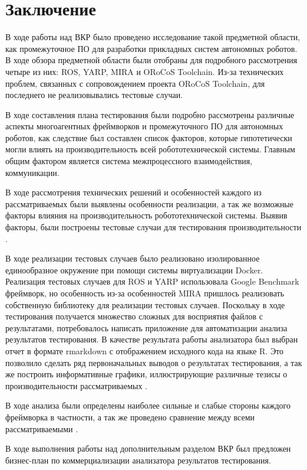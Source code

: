 \chapter*{Заключение}

В ходе работы над ВКР было проведено исследование такой предметной области, как промежуточное ПО для разработки прикладных систем автономных роботов. В ходе обзора предметной области были отобраны для подробного рассмотрения четыре из них: ROS, YARP, MIRA и ORoCoS Toolchain. Из-за технических проблем, связанных с сопровождением проекта ORoCoS Toolchain, для последнего не реализовывались тестовые случаи.

В ходе составления плана тестирования были подробно рассмотрены различные аспекты многоагентных фреймворков и промежуточного ПО для автономных роботов, как следствие был составлен список факторов, которые гипотетически могли влиять на производительность всей робототехнической системы. Главным общим фактором является система межпроцессного взаимодействия, коммуникации.

В ходе рассмотрения технических решений и особенностей каждого из рассматриваемых \marm{} были выявлены особенности реализации, а так же возможные факторы влияния на производительность робототехнической системы. Выявив факторы, были построены тестовые случаи для тестирования производительности \marm{}.

В ходе реализации тестовых случаев было реализовано изолированное единообразное окружение при помощи системы виртуализации Docker. Реализация тестовых случаев для ROS и YARP использовала Google Benchmark фреймворк, но особенность из-за особенностей MIRA пришлось реализовать собственную библиотеку для реализации тестовых случаев. Поскольку в ходе тестирования получается множество сложных для восприятия файлов с результатами, потребовалось написать приложение для автоматизации анализа результатов тестирования. В качестве результата работы анализатора был выбран отчет в формате rmarkdown с отображением исходного кода на языке R. Это позволило сделать ряд первоначальных выводов о результатах тестирования, а так же построить информативные графики, иллюстрирующие различные тезисы о производительности рассматриваемых \marm{}.

В ходе анализа были определены наиболее сильные и слабые стороны каждого фреймворка в частности, а так же проведено сравнение между всеми рассматриваемыми \marm{}.

В ходе выполнения работы над дополнительным разделом ВКР был предложен бизнес-план по коммерциализации анализатора результатов тестирования.

